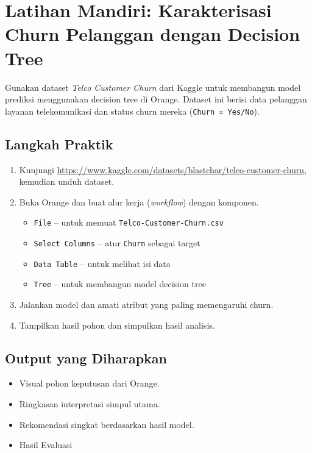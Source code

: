 \section{Latihan Mandiri: Karakterisasi Churn Pelanggan dengan Decision Tree}

Gunakan dataset \textit{Telco Customer Churn} dari Kaggle untuk membangun model prediksi menggunakan decision tree di Orange. Dataset ini berisi data pelanggan layanan telekomunikasi dan status churn mereka (\texttt{Churn = Yes/No}).

\subsection*{Langkah Praktik}

\begin{enumerate}
	\item Kunjungi \url{https://www.kaggle.com/datasets/blastchar/telco-customer-churn}, kemudian unduh dataset.
	\item Buka Orange dan buat alur kerja (\textit{workflow}) dengan komponen. 
	\begin{itemize}
		\item \texttt{File} – untuk memuat \texttt{Telco-Customer-Churn.csv}
		\item \texttt{Select Columns} – atur \texttt{Churn} sebagai target
		\item \texttt{Data Table} – untuk melihat isi data
		\item \texttt{Tree} – untuk membangun model decision tree
	\end{itemize}
	\item Jalankan model dan amati atribut yang paling memengaruhi churn.
	\item Tampilkan hasil pohon dan simpulkan hasil analisis.
\end{enumerate}

\subsection*{Output yang Diharapkan}

\begin{itemize}
	\item Visual pohon keputusan dari Orange.
	\item Ringkasan interpretasi simpul utama.
	\item Rekomendasi singkat berdasarkan hasil model.
	\item Hasil Evaluasi
\end{itemize}


